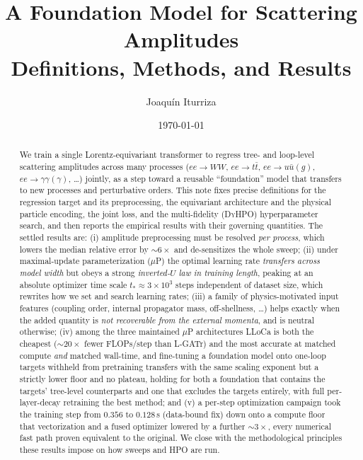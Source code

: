 \documentclass[11pt]{article}
\title{\textbf{A Foundation Model for Scattering Amplitudes}\\[2pt]
\large Definitions, Methods, and Results}
\author{Joaqu\'in Iturriza}
\date{\today}
\newcommand{\tstar}{t_\ast}
\begin{document}
\maketitle

\begin{abstract}
We train a single Lorentz-equivariant transformer to regress tree- and loop-level
scattering amplitudes across many processes ($ee\!\to\!WW$, $ee\!\to\!t\bar t$,
$ee\!\to\!u\bar u(g)$, $ee\!\to\!\gamma\gamma(\gamma)$, \dots) jointly, as a step
toward a reusable ``foundation'' model that transfers to new processes and
perturbative orders. This note fixes precise definitions for the regression target
and its preprocessing, the equivariant architecture and the physical particle
encoding, the joint loss, and the multi-fidelity (\textsc{DyHPO}) hyperparameter
search, and then reports the empirical results with their governing quantities. The
settled results are: (i) amplitude preprocessing must be resolved \emph{per process},
which lowers the median relative error by $\sim\!6\times$ and de-sensitizes the whole
sweep; (ii) under maximal-update parameterization ($\mu$P) the optimal learning rate
\emph{transfers across model width} but obeys a strong \emph{inverted-$U$ law in
training length}, peaking at an absolute optimizer time scale $\tstar\!\approx\!3\times10^3$
steps independent of dataset size, which rewrites how we set and search learning
rates; (iii) a family of physics-motivated input features (coupling order, internal
propagator mass, off-shellness, \dots) helps exactly when the added quantity is
\emph{not recoverable from the external momenta}, and is neutral otherwise; (iv) among
the three maintained $\mu$P architectures LLoCa is both the cheapest ($\sim\!20\times$ fewer
FLOPs/step than L-GATr) and the most accurate at matched compute \emph{and} matched wall-time,
and fine-tuning a foundation model onto one-loop targets withheld from pretraining transfers
with the same
scaling exponent but a strictly lower floor and no plateau, holding for both a foundation that
contains the targets' tree-level counterparts and one that excludes the targets entirely, with
full per-layer-decay retraining
the best method; and (v) a per-step optimization campaign took the training step from
$0.356$ to $0.128$\,s (data-bound fix) down onto a compute floor that vectorization and
a fused optimizer lowered by a further $\sim\!3\times$, every numerical fast path proven
equivalent to the original. We close with the methodological principles these results
impose on how sweeps and HPO are run.
\end{abstract}
\end{document}
